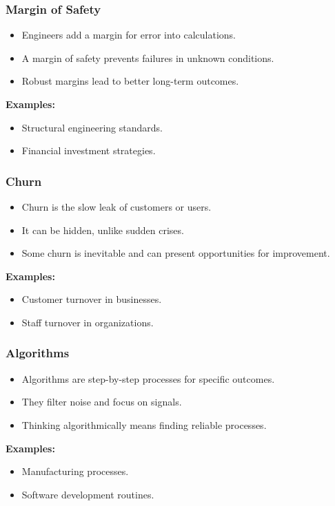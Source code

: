 \begin{frame}[fragile]\frametitle{Margin of Safety}
\begin{itemize}
    \item Engineers add a margin for error into calculations.
    \item A margin of safety prevents failures in unknown conditions.
    \item Robust margins lead to better long-term outcomes.
\end{itemize}
\textbf{Examples:}
\begin{itemize}
    \item Structural engineering standards.
    \item Financial investment strategies.
\end{itemize}
\end{frame}

\begin{frame}[fragile]\frametitle{Churn}
\begin{itemize}
    \item Churn is the slow leak of customers or users.
    \item It can be hidden, unlike sudden crises.
    \item Some churn is inevitable and can present opportunities for improvement.
\end{itemize}
\textbf{Examples:}
\begin{itemize}
    \item Customer turnover in businesses.
    \item Staff turnover in organizations.
\end{itemize}
\end{frame}

\begin{frame}[fragile]\frametitle{Algorithms}
\begin{itemize}
    \item Algorithms are step-by-step processes for specific outcomes.
    \item They filter noise and focus on signals.
    \item Thinking algorithmically means finding reliable processes.
\end{itemize}
\textbf{Examples:}
\begin{itemize}
    \item Manufacturing processes.
    \item Software development routines.
\end{itemize}
\end{frame}

